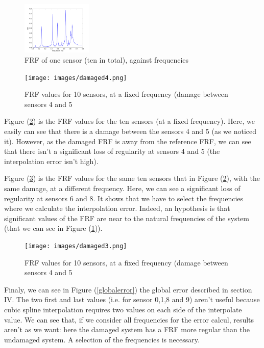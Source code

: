\documentclass[journal]{IEEEtran}
\begin{document}
\begin{figure}[h!]
  \centering
  \includegraphics[width=0.3\textwidth]{images/persensor1.png}
  \caption{FRF of one sensor (ten in total), against frequencies}
  \label{frf_freq}
\end{figure}


\begin{figure}[h!]
  \centering
  \texttt{[image: images/damaged4.png]}
  \caption{FRF values for 10 sensors, at a fixed frequency (damage between sensors 4 and 5}
  \label{damage}
\end{figure}

Figure (\ref{damage}) is the FRF values for the ten sensors (at a fixed frequency). Here, we easily can see that there is a damage between the sensors 4 and 5 (as we noticed it). However, as the damaged FRF is away from the reference FRF, we can see that there isn't a significant loss of regularity at sensors 4 and 5 (the interpolation error isn't high).



Figure (\ref{damage2}) is the FRF values for the same ten sensors that in Figure (\ref{damage}), with the same damage, at a different frequency. Here, we can see a significant loss of regularity at sensors 6 and 8. It shows that we have to select the frequencies where we calculate the interpolation error. Indeed, an hypothesis is that significant values of the FRF are near to the natural frequencies of the system (that we can see in Figure (\ref{frf_freq})).


\begin{figure}[h!]
  \centering
  \texttt{[image: images/damaged3.png]}
  \caption{FRF values for 10 sensors, at a fixed frequency (damage between sensors 4 and 5}
  \label{damage2}
\end{figure}

Finaly, we can see in Figure (\ref{globalerror}) the global error described in section IV. The two first and last values (i.e. for sensor 0,1,8 and 9) aren't useful because cubic spline interpolation requires two values on each side of the interpolate value. We can see that, if we consider all frequencies for the error calcul, results aren't as we want: here the damaged system has a FRF more regular than the undamaged system. A selection of the frequencies is necessary.
\end{document}
